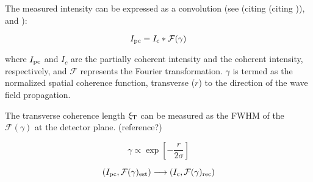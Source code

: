 \documentclass{osa-article}
\newcommand{\mathup}[1]{\text{\textup{#1}}}
\begin{document}
The measured intensity can be expressed as a convolution (see \cite[(eq.33)]{VartanyantsRobinson2001} \cite[(eq.23)]{WilliamsQuineyPeeleEtAl2007} (citing \cite{LinPatersonPeeleEtAl2003} (citing \cite{Nugent1991})), \cite[(eq.1)]{WhiteheadWilliamsQuineyEtAl2009} and \cite[(eq.5)]{ClarkHuangHarderEtAl2012}):

\[I_{\mathup{pc}} = I_\mathup{c} \ast \mathcal{F}(\gamma)\]

where $I_{\mathup{pc}}$ and $I_c$ are the partially coherent intensity and the coherent intensity, respectively, and $\mathcal{F}$ represents the Fourier transformation. $\gamma$ is termed as the normalized spatial coherence function, transverse ($r$) to the direction of the wave field propagation.

The transverse coherence length $\xi_\mathup{T}$ can be measured as the FWHM of the $\mathcal{F}(\gamma)$ at the detector plane. (reference?) 

\[\gamma \propto \exp\!\left[-\frac{r}{2\sigma}\right]\]


\[\left( I_{\mathup{pc}},\mathcal{F}(\gamma)_{\mathup{est}}\right)  \longrightarrow \left( I_\mathup{c}, \mathcal{F}(\gamma)_{\mathup{rec}} \right)  \]




\end{document}
